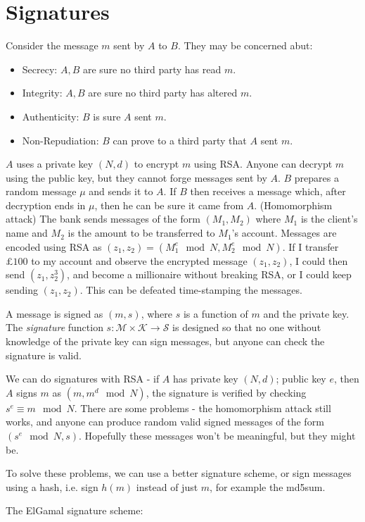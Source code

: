 \documentclass[10pt,a4paper]{article}
\begin{document}
\section{Signatures}
Consider the message $m$ sent by $A$ to $B$. They may be concerned abut:
\begin{itemize}
\item Secrecy: $A,B$ are sure no third party has read $m$.
\item Integrity: $A,B$ are sure no third party has altered $m$.
\item Authenticity: $B$ is sure $A$ sent $m$.
\item Non-Repudiation: $B$ can prove to a third party that $A$ sent $m$.
\end{itemize}
\example $A$ uses a private key $(N,d)$ to encrypt $m$ using RSA. Anyone can decrypt $m$ using the public key, but they cannot forge messages sent by $A$. $B$ prepares a random message $\mu$ and sends it to $A$. If $B$ then receives a message which, after decryption ends in $\mu$, then he can be sure it came from $A$.
\example (Homomorphism attack) The bank sends messages of the form $(M_1, M_2)$ where $M_1$ is the client's name and $M_2$ is the amount to be transferred to $M_1$'s account. Messages are encoded using RSA as $(z_1,z_2) = (M_1^e \mod N, M_2^e \mod N)$. If I transfer $£100$ to my account and observe the encrypted message $(z_1, z_2)$, I could then send $(z_1, z_2^3)$, and become a millionaire without breaking RSA, or I could keep sending $(z_1, z_2)$. This can be defeated time-stamping the messages.

A message is signed as $(m,s)$, where $s$ is a function of $m$ and the private key. The \emph{signature} function $s: \mathcal{M}\times \mathcal{K} \to \mathscr{S}$ is designed so that no one without knowledge of the private key can sign messages, but anyone can check the signature is valid.

We can do signatures with RSA - if $A$ has private key $(N,d)$; public key $e$, then $A$ signs $m$ as $(m, m^d \mod N)$, the signature is verified by checking $s^e \equiv m \mod N$. There are some problems - the homomorphism attack still works, and anyone can produce random valid signed messages of the form $(s^e \mod N, s)$. Hopefully these messages won't be meaningful, but they might be.

To solve these problems, we can use a better signature scheme, or sign messages using a hash, i.e. sign $h(m)$ instead of just $m$, for example the md5sum.

\example The ElGamal signature scheme:
\end{document}
